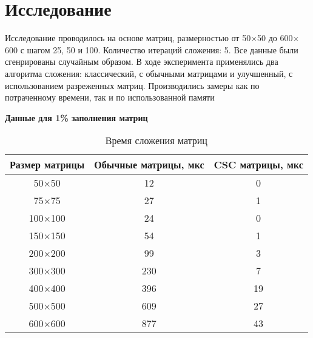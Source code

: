 \section{Исследование}
\setcounter{table}{0}
Исследование проводилось на основе матриц, размерностью от 50$\times$50 до 600$\times$600 с шагом 25, 50 и 100. Количество итераций сложения: 5. Все данные
были сгенрированы случайным образом. В ходе эксперимента применялись
два алгоритма сложения: классический, с обычными матрицами и улучшенный, с использованием разреженных матриц. 
Производились замеры как по потраченному времени, так и по использованной памяти

\vspace{1.5em}
\textbf{Данные для 1\% заполнения матриц}
\begin{table}[H]
	\centering
	\caption{Время сложения матриц}
	\begin{tabular}{|c|c|c|}
		\hline
		Размер матрицы & Обычные матрицы, мкс & CSC матрицы, мкс \\ \hline
		50$\times$50         & 12                   & 0                \\ \hline
		75$\times$75         & 27                   & 1                \\ \hline
		100$\times$100        & 24                   & 0                \\ \hline
		150$\times$150        & 54                   & 1                \\ \hline
		200$\times$200        & 99                   & 3                \\ \hline
		300$\times$300        & 230                  & 7                \\ \hline
		400$\times$400        & 396                  & 19               \\ \hline
		500$\times$500        & 609                  & 27               \\ \hline
		600$\times$600        & 877                  & 43               \\ \hline
	\end{tabular}
\end{table}

